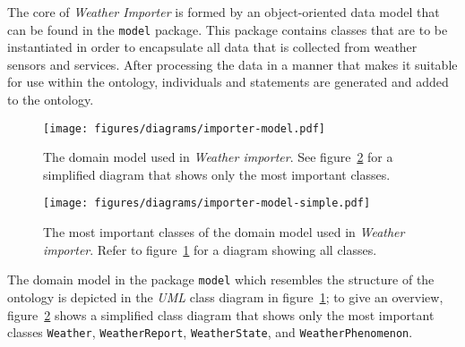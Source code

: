 The core of \emph{Weather Importer} is formed by an object-oriented data model that can be found in the \texttt{model} package. This package contains classes that are to be instantiated in order to encapsulate all data that is collected from weather sensors and services. After processing the data in a manner that makes it suitable for use within the \thinkhomeweather ontology, individuals and statements are generated and added to the ontology.

\begin{figure}
\centering
\texttt{[image: figures/diagrams/importer-model.pdf]}
\caption{The domain model used in \emph{Weather importer}. See figure~\ref{fig:importer_model2} for a simplified diagram that shows only the most important classes.}
\label{fig:importer_model1}
\end{figure}

\begin{figure}
\centering
\texttt{[image: figures/diagrams/importer-model-simple.pdf]}
\caption{The most important classes of the domain model used in \emph{Weather importer}. Refer to figure~\ref{fig:importer_model1} for a diagram showing all classes.}
\label{fig:importer_model2}
\end{figure}

The domain model in the package \texttt{model} which resembles the structure of the \thinkhomeweather ontology is depicted in the \emph{UML} class diagram in figure~\ref{fig:importer_model1}; to give an overview, figure~\ref{fig:importer_model2} shows a simplified class diagram that shows only the most important classes \texttt{Weather}, \texttt{WeatherReport}, \texttt{WeatherState}, and \texttt{WeatherPhenomenon}.

